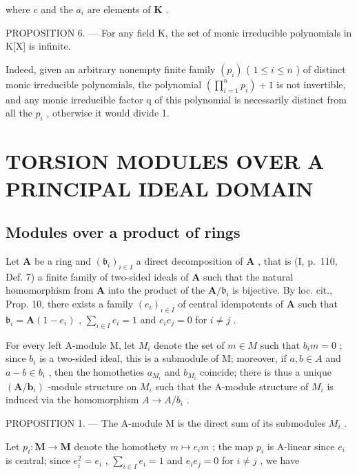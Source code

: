 where \(c\) and the \(a_{i}\) are elements of \(\mathbf{K}\) .

PROPOSITION 6. --- For any field K, the set of monic irreducible polynomials in K{[}X{]} is infinite.

Indeed, given an arbitrary nonempty finite family \((p_{i})\) ( \(1 \leqslant i \leqslant n\) ) of distinct monic irreducible polynomials, the polynomial \(\left(\prod_{i=1}^{n} p_{i}\right) + 1\) is not invertible, and any monic irreducible factor q of this polynomial is necessarily distinct from all the \(p_{i}\) , otherwise it would divide 1.

\section{TORSION MODULES OVER A PRINCIPAL IDEAL DOMAIN}

\subsection{Modules over a product of rings}

Let \(\mathbf{A}\) be a ring and \((\mathfrak{b}_i)_{i\in I}\) a direct decomposition of \(\mathbf{A}\) , that is (I, p.~110, Def. 7) a finite family of two-sided ideals of \(\mathbf{A}\) such that the natural homomorphism from \(\mathbf{A}\) into the product of the \(\mathbf{A} / \mathfrak{b}_i\) is bijective. By loc. cit., Prop. 10, there exists a family \((e_i)_{i\in I}\) of central idempotents of \(\mathbf{A}\) such that \(\mathfrak{b}_i = \mathbf{A}(1 - e_i)\) , \(\sum_{i\in I}e_i = 1\) and \(e_i e_j = 0\) for \(i\neq j\) .

For every left A-module M, let \(M_{i}\) denote the set of \(m \in M\) such that \(b_{i}m = 0\) ; since \(b_{i}\) is a two-sided ideal, this is a submodule of M; moreover, if \(a, b \in A\) and \(a - b \in b_{i}\) , then the homotheties \(a_{M_{i}}\) and \(b_{M_{i}}\) coincide; there is thus a unique \((\mathbf{A}/\mathbf{b}_{i})\) -module structure on \(M_{i}\) such that the A-module structure of \(M_{i}\) is induced via the homomorphism \(A \to A/b_{i}\) .

PROPOSITION 1. --- The A-module M is the direct sum of its submodules \(M_{i}\) .

Let \(p_i: \mathbf{M} \to \mathbf{M}\) denote the homothety \(m \mapsto e_i m\) ; the map \(p_i\) is A-linear since \(e_i\) is central; since \(e_i^2 = e_i\) , \(\sum_{i \in I} e_i = 1\) and \(e_i e_j = 0\) for \(i \neq j\) , we have

